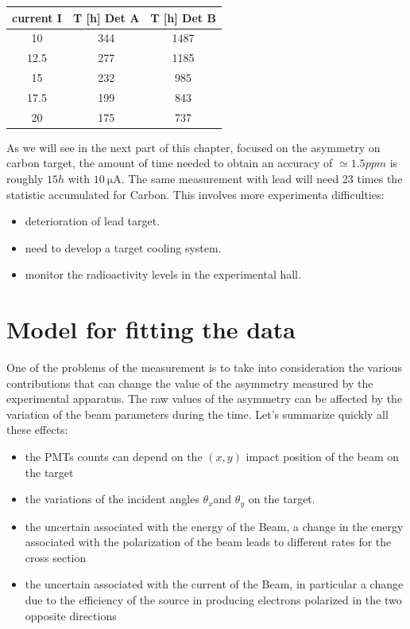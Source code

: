 \begin{table}[ht]
\centering
\begin{tabular}{c|c|c}
\hline
   current I &   T [h] Det A &   T [h] Det B \\
\hline
        10   &       344 &      1487  \\
        12.5 &       277 &      1185   \\
        15   &       232 &      985 \\
        17.5 &       199 &      843 \\
        20   &       175 &      737 \\
\hline
\end{tabular}
\end{table}

As we will see in the next part of this chapter, focused on the asymmetry on carbon target, the amount of time needed to obtain an accuracy of $\simeq 1.5 ppm$ is roughly $15 h$ with $\SI{10}{\micro \ampere}$. The same measurement with lead will need 23 times the statistic accumulated for Carbon. This involves more experimenta difficulties:

\begin{itemize}
\item deterioration of lead target.
\item need to develop a target cooling system.
\item monitor the radioactivity levels in the experimental hall.
\end{itemize}  
 
\section{Model for fitting the data} \label{Model}
\bigskip

One of the problems of the measurement is to take into consideration the various contributions that can change the value of the asymmetry measured by the experimental apparatus. The raw values of the asymmetry can be affected by the variation of the beam parameters during the time. Let's summarize quickly all these effects:
\begin{itemize}
\item the PMTs counts  can depend on the $(x,y)$ impact position of the beam on the target
\item the variations of the incident angles $\theta_{x}$and $\theta_{y}$ on the target.
\item the uncertain associated with the energy of the Beam, a change in the energy associated with the polarization of the beam leads to different rates for the cross section
\item the uncertain associated with the current of the Beam, in particular a change due to the 
efficiency of the source in producing electrons polarized in the two opposite directions
\end{itemize}

